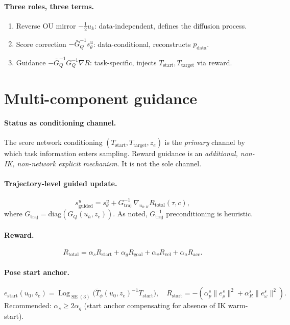 \documentclass[11pt,a4paper]{article}
\DeclareMathOperator{\Log}{Log}
\DeclareMathOperator{\SE}{SE}
\newcommand{\GQ}{G_Q}
\newcommand{\GQbar}{\bar G_Q}
\begin{document}
\paragraph{Three roles, three terms.}
\begin{enumerate}[noitemsep]
    \item Reverse OU mirror $-\tfrac{1}{2} u_k$: data-independent, defines the diffusion process.
    \item Score correction $-\GQbar^{-1} s_\theta^u$: data-conditional, reconstructs $p_\text{data}$.
    \item Guidance $-\GQbar^{-1} \GQ^{-1} \nabla R$: task-specific, injects $T_\text{start}, T_\text{target}$ via reward.
\end{enumerate}

\section{Multi-component guidance}
\label{sec:guidance}

\paragraph{Status as conditioning channel.} The score network conditioning $(T_\text{start}, T_\text{target}, z_e)$ is the \emph{primary} channel by which task information enters sampling. Reward guidance is an \emph{additional, non-IK, non-network explicit mechanism}. It is not the sole channel.

\paragraph{Trajectory-level guided update.}
\begin{equation}
s_\text{guided}^u = s_\theta^u + G_\text{traj}^{-1}\, \nabla_{u_{0:H}} R_\text{total}(\tau, c),
\end{equation}
where $G_\text{traj} = \mathrm{diag}(\GQ(u_h, z_e))$. As noted, $G_\text{traj}^{-1}$ preconditioning is heuristic.

\paragraph{Reward.}
\begin{equation}
R_\text{total} = \alpha_s R_\text{start} + \alpha_g R_\text{goal} + \alpha_v R_\text{vel} + \alpha_a R_\text{acc}.
\end{equation}

\paragraph{Pose start anchor.}
\begin{equation}
e_\text{start}(u_0, z_e) = \Log_{\SE(3)}\bigl(\widetilde T_\phi(u_0, z_e)^{-1} T_\text{start}\bigr), \quad R_\text{start} = -(\alpha_p^s \|e_\rho^s\|^2 + \alpha_R^s \|e_\omega^s\|^2).
\end{equation}
Recommended: $\alpha_s \geq 2 \alpha_g$ (start anchor compensating for absence of IK warm-start).
\end{document}
